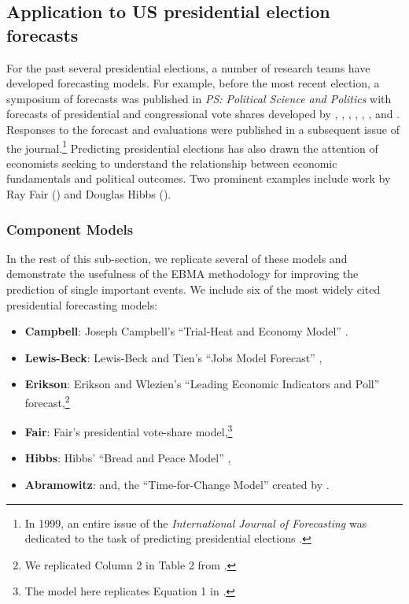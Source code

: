\documentclass[pdftex,12pt,fullpage,oneside]{amsart}
\begin{document}
\subsection{Application to US presidential election forecasts}
For the past several presidential elections, a number of research
teams have developed forecasting models.  For example, before the most
recent election, a symposium of forecasts was published in \emph{PS:
  Political Science and Politics} with forecasts of presidential and
congressional vote shares developed by \citet{Campbell:2008},
\citet{Norpoth:2008}, \citet{Lewis-Beck:Tien:2008},
\citet{Abramowitz:2008}, \citet{Erikson:Wlezien:2008},
\citet{Holbrook:2008}, \citet{Lockerbie:2008} and
\citet{Cuzan:Bundrick:2008}.  Responses to the forecast and
evaluations were published in a subsequent issue of the
journal.\footnote{In 1999, an entire issue of the
  \textit{International Journal of Forecasting} was dedicated to the
  task of predicting presidential elections \citep{Brown:1999}.}
Predicting presidential elections has also drawn the attention of
economists seeking to understand the relationship between economic
fundamentals and political outcomes.  Two prominent examples include
work by Ray Fair (\citeyear{Fair:2010}) and Douglas Hibbs
(\citeyear{Hibbs:2000}).

\subsubsection{Component Models}

In the rest of this sub-section, we replicate several of these models and
demonstrate the usefulness of the EBMA methodology for improving the
prediction of single important events.  We include six of the most widely cited
presidential forecasting models: 
\begin{itemize}
\item \textbf{Campbell}: Joseph Campbell's ``Trial-Heat and Economy Model''
  \citep{Campbell:2008}.
\item \textbf{Lewis-Beck}: Lewis-Beck and Tien's ``Jobs Model Forecast'' \citep{Lewis-Beck:Tien:2008},
\item \textbf{Erikson}: Erikson and Wlezien's ``Leading Economic Indicators
  and Poll'' forecast,\footnote{We replicated Column 2 in Table 2 from \citet{Erikson:Wlezien:2008}.}
\item \textbf{Fair}: Fair's presidential vote-share model,\footnote{The model here replicates Equation 1 in \citet{Fair:2010}.}
\item \textbf{Hibbs}: Hibbs' ``Bread and Peace Model'' \citep{Hibbs:2000},
\item \textbf{Abramowitz}: and,  the ``Time-for-Change Model'' created by
  \citet{Abramowitz:2008}.  
\end{itemize}
\end{document}
